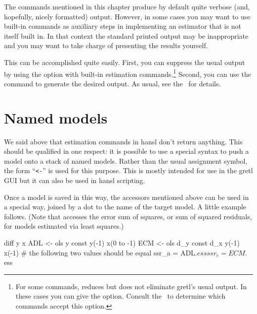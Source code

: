 The commands mentioned in this chapter produce by default quite
verbose (and, hopefully, nicely formatted) output. However, in some
cases you may want to use built-in commands as auxiliary steps in
implementing an estimator that is not itself built in. In that context
the standard printed output may be inappropriate and you may want to
take charge of presenting the results yourself. 

This can be accomplished quite easily. First, you can suppress the
usual output by using the  option with built-in
estimation commands.\footnote{For some commands, 
  reduces but does not eliminate gretl's usual output. In these cases
  you can give the  option. Consult the \GCR\ to
  determine which commands accept this option.} Second, you can
use the  command to generate the desired output.
As usual, see the \GCR\ for details.

\section{Named models}

We said above that estimation commands in hansl don't return
anything. This should be qualified in one respect: it is possible to
use a special syntax to push a model onto a stack of named models.
Rather than the usual assignment symbol, the form ``\verb|<-|'' is
used for this purpose. This is mostly intended for use in the gretl
GUI but it can also be used in hansl scripting.

Once a model is saved in this way, the accessors mentioned above can
be used in a special way, joined by a dot to the name of the target
model. A little example follows. (Note that  accesses the
error sum of squares, or sum of squared residuals, for models
estimated via least squares.)

\begin{code}
diff y x
ADL <- ols y const y(-1) x(0 to -1)
ECM <- ols d_y const d_x y(-1) x(-1)
# the following two values should be equal
ssr_a = ADL.$ess
ssr_e = ECM.$ess
\end{code}


